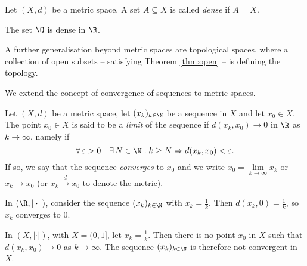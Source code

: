 \np

\begin{definition}
Let $(X,d)$ be a metric space. A set $A \subseteq X$ is called \emph{dense} 
if $\overline{A} = X$.
\end{definition}

\begin{example}
The set $\Q$ is dense in $\R$.
\end{example}

\bis

\begin{remark} A further generalisation beyond metric spaces are topological spaces, where a collection of open subsets -- satisfying Theorem 
\ref{thm:open} -- is defining the topology.  
\end{remark}


%
%







We extend the concept of convergence of sequences to metric spaces.

\begin{definition}
Let $(X,d)$ be a metric space, let $(x_k)_{k \in \N}$ be a sequence in $X$ and let $x_0\in X$. The point
$x_0 \in X$ is said to be a \emph{limit} of the sequence if $d(x_k,x_0) \to 0$
in $\R$ as $k \to \infty$, namely if  
$$
\forall \, \varepsilon>0 \quad \exists \,N\in \N: k\geq N \Rightarrow d(x_k,x_0)<\varepsilon.
$$
If so, we say that the sequence \emph{converges} to
$x_0$ and we write $x_0 = \lim\limits_{k \to \infty} x_k$ or $x_k \to x_0$ (or $x_k \stackrel{d}{\to} x_0$ to denote the metric).
\end{definition}

\np

\begin{example}
In $(\R, |\cdot|)$, consider the sequence $(x_k)_{k \in \N}$
with $x_k = \frac{1}{k}$. Then $d(x_k,0) = \frac{1}{k}$, so $x_k$
converges to $0$.
\end{example}

\begin{example}
In $(X,|\cdot|)$, with $X = (0,1]$, let $x_k = \frac{1}{k}$. Then there is no point $x_0$ in $X$ such that
$d(x_k,x_0) \to 0$ as $k \to \infty$. The sequence $(x_k)_{k \in \N}$
is therefore not convergent in $X$.
\end{example}

